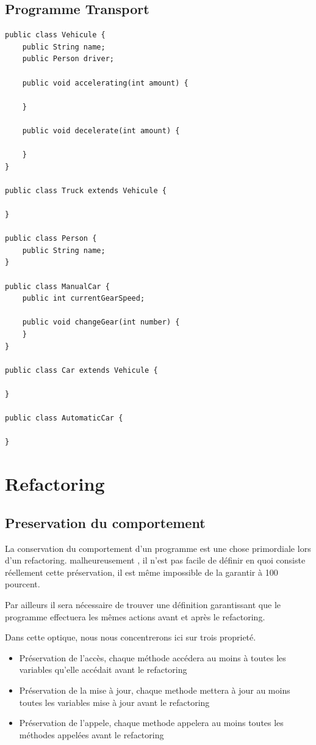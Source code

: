 \documentclass[a4paper, 12pt]{article}
\begin{document}
\subsection{Programme Transport}

\begin{lstlisting}[frame=single]
public class Vehicule {
	public String name;
	public Person driver;

	public void accelerating(int amount) {

	}

	public void decelerate(int amount) {
	
	}
}

public class Truck extends Vehicule {

}

public class Person {
	public String name;
}

public class ManualCar {
	public int currentGearSpeed;
	
	public void changeGear(int number) {
	}
}

public class Car extends Vehicule {

}

public class AutomaticCar {

}
\end{lstlisting}

\newpage
\section{Refactoring}

\subsection{Preservation du comportement}
\label{subsec:preservationDuComportement}

La conservation du comportement d'un programme est une chose primordiale lors d'un refactoring. malheureusement , il n'est pas facile de définir en quoi consiste réellement cette préservation, il est même impossible de la garantir à 100 pourcent. 

Par ailleurs il sera nécessaire de trouver une définition garantissant que le programme effectuera les mêmes actions avant et après le refactoring. 

Dans cette optique, nous nous concentrerons ici sur trois proprieté.

\begin{itemize}[label=\textbullet]
\item Préservation de l'accès, chaque méthode accédera au moins à toutes les variables qu'elle accédait avant le refactoring
\item Préservation de la mise à jour, chaque methode mettera à jour au moins toutes les variables mise à jour avant le refactoring
\item Préservation de l'appele, chaque methode appelera au moins toutes les méthodes appelées avant le refactoring
\end{itemize}
\end{document}
